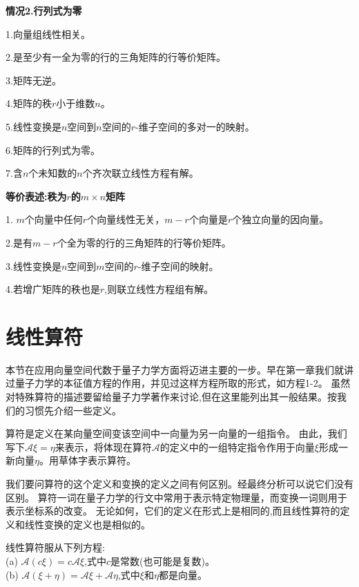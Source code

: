 \begin{center}
    \textbf{情况2.行列式为零}
\end{center}

1.向量组线性相关。

2.是至少有一全为零的行的三角矩阵的行等价矩阵。

3.矩阵无逆。

4.矩阵的秩$r$小于维数$n$。

5.线性变换是$n$空间到$n$空间的$r$-维子空间的多对一的映射。

6.矩阵的行列式为零。

7.含$n$个未知数的$n$个齐次联立线性方程有解。

\begin{center}
    \textbf{等价表述:秩为$r$的$m \times n$矩阵}
\end{center}

1. $m$个向量中任何$r$个向量线性无关，$m-r$个向量是$r$个独立向量的因向量。

2.是有$m-r$个全为零的行的三角矩阵的行等价矩阵。

3.线性变换是$n$空间到$m$空间的$r$-维子空间的映射。

4.若增广矩阵的秩也是$r$,则联立线性方程组有解。

\section{线性算符}

本节在应用向量空间代数于量子力学方面将迈进主要的一步。早在第一章我们就讲过量子力学的本征值方程的作用，并见过这样方程所取的形式，如方程1-2。
虽然对特殊算符的描述要留给量子力学著作来讨论,但在这里能列出其一般结果。按我们的习惯先介绍一些定义。

\begin{definition}[算符]
    算符是定义在某向量空间变该空间中一向量为另一向量的一组指令。
    由此，我们写下$\mathscr{A}\xi=\eta$来表示，将体现在算符$\mathscr{A}$的定义中的一组特定指令作用于向量$\xi$形成一新向量$\eta$。用草体字表示算符。
\end{definition}

我们要问算符的这个定义和变换的定义之间有何区别。经最终分析可以说它们没有区别。
算符一词在量子力学的行文中常用于表示特定物理量，而变换一词则用于表示坐标系的改变。
无论如何，它们的定义在形式上是相同的,而且线性算符的定义和线性变换的定义也是相似的。

\begin{definition}[线性算符]
    线性算符服从下列方程:\\
    (a) $\mathscr{A}(c\xi)=c\mathscr{A}\xi$,式中$c$是常数(也可能是复数)。\\
    (b) $\mathscr{A}(\xi+\eta)=\mathscr{A}\xi+\mathscr{A}\eta$,式中$\xi$和$\eta$都是向量。
\end{definition}

